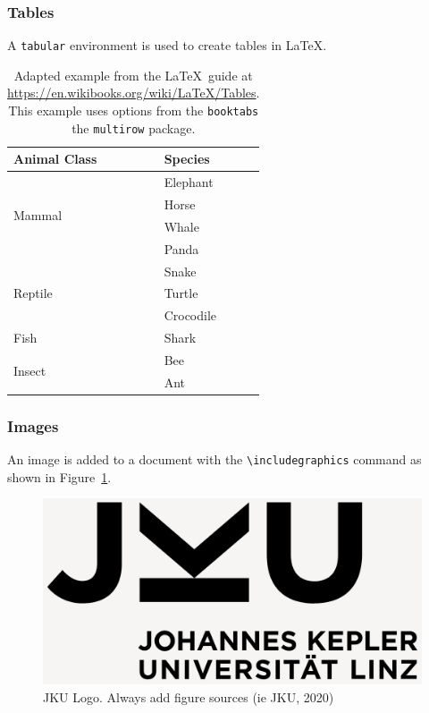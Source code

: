 \documentclass[11pt,a4paper]{article} %
\begin{document}
\subsubsection{Tables}
A \verb|tabular| environment is used to create tables in \LaTeX.
\begin{table}[h] %
  \centering
  \begin{tabular}{ll}
    \toprule
    Animal Class & Species \\
    \midrule
    \multirow{4}{*}{Mammal} & Elephant\\
                            & Horse \\
                            & Whale \\
                            & Panda \\
    \midrule
    \multirow{3}{*}{Reptile} & Snake \\
                             & Turtle \\
                             & Crocodile \\
    \midrule
    Fish & Shark \\
    \midrule
    \multirow{2}{*}{Insect} & Bee\\
                            & Ant\\
    \bottomrule
  \end{tabular}
  \caption{Adapted example from the \LaTeX\ guide at \url{https://en.wikibooks.org/wiki/LaTeX/Tables}. This example uses options from the \texttt{booktabs} the \texttt{multirow} package.}
  \label{tab:intro} %
\end{table}

\subsubsection{Images}
An image is added to a document with the \verb|\includegraphics| command as shown in Figure~\ref{fig:jku_logo}.

\begin{figure}[!htb]
    \centering
    \includegraphics[width=\textwidth]{img/JKU_Logo.png}
    \caption{JKU Logo. Always add figure sources (ie JKU, 2020)}
    \label{fig:jku_logo}
\end{figure}
\end{document}

